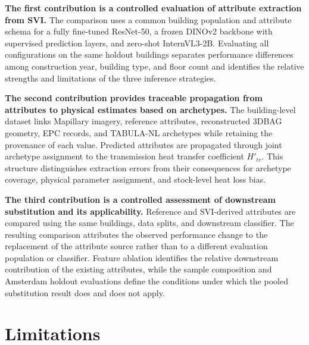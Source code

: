 \textbf{The first contribution is a controlled evaluation of attribute extraction from SVI.}
The comparison uses a common building population and attribute schema for a fully fine-tuned ResNet-50, a frozen DINOv2 backbone with supervised prediction layers, and zero-shot InternVL3-2B.
Evaluating all configurations on the same holdout buildings separates performance differences among construction year, building type, and floor count and identifies the relative strengths and limitations of the three inference strategies.

\textbf{The second contribution provides traceable propagation from attributes to physical estimates based on archetypes.}
The building-level dataset links Mapillary imagery, reference attributes, reconstructed 3DBAG geometry, EPC records, and TABULA-NL archetypes while retaining the provenance of each value.
Predicted attributes are propagated through joint archetype assignment to the transmission heat transfer coefficient $H'_{tr}$.
This structure distinguishes extraction errors from their consequences for archetype coverage, physical parameter assignment, and stock-level heat loss bias.

\textbf{The third contribution is a controlled assessment of downstream substitution and its applicability.}
Reference and \ac{SVI}-derived attributes are compared using the same buildings, data splits, and downstream classifier.
The resulting comparison attributes the observed performance change to the replacement of the attribute source rather than to a different evaluation population or classifier.
Feature ablation identifies the relative downstream contribution of the existing attributes, while the sample composition and Amsterdam holdout evaluations define the conditions under which the pooled substitution result does and does not apply.

\section{Limitations}
\label{sec:limitations}

